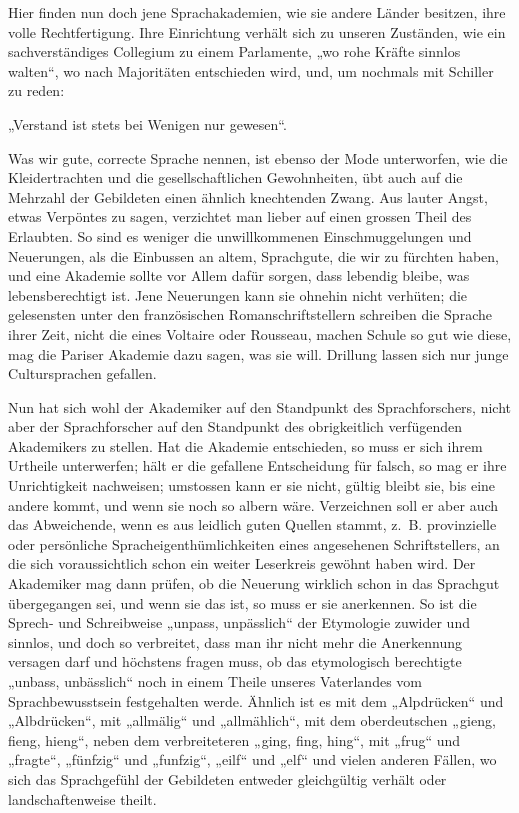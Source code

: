\largerpage[-1]Hier finden nun doch jene Sprachakademien, wie sie andere Länder besitzen, ihre volle Rechtfertigung. Ihre Einrichtung verhält sich zu unseren Zuständen, wie ein sachverständiges Collegium zu einem Parlamente, „wo rohe Kräfte sinnlos walten“, wo nach Majoritäten entschieden wird, und, um nochmals mit Schiller zu reden:

\begin{center}
„Verstand ist stets bei Wenigen nur gewesen“.
\end{center}

Was wir gute, correcte Sprache nennen, ist ebenso der Mode unterworfen, wie die Kleidertrachten und die gesellschaftlichen Gewohnheiten, übt auch auf die Mehrzahl der Gebildeten einen ähnlich knechtenden Zwang. Aus lauter Angst, etwas Verpöntes zu sagen, verzichtet man lieber auf einen grossen Theil des Erlaubten. So sind es weniger die unwillkommenen Einschmuggelungen und Neuerungen, als die Einbussen an altem,  Sprachgute, die wir zu fürchten haben, und eine Akademie sollte vor Allem dafür sorgen, dass lebendig bleibe, was lebensberechtigt ist. Jene Neuerungen kann sie ohnehin nicht verhüten; die gelesensten unter den französischen Romanschriftstellern schreiben die Sprache ihrer Zeit, nicht die eines Voltaire oder Rousseau, machen Schule so gut wie diese, mag die Pariser Akademie dazu sagen, was sie will.  Drillung lassen sich nur junge Cultursprachen gefallen.

Nun hat sich wohl der Akademiker auf den Standpunkt des Sprachforschers, nicht aber der Sprachforscher auf den Standpunkt des obrigkeitlich verfügenden Akademikers zu stellen. Hat die Akademie entschieden, so muss er sich ihrem Urtheile unterwerfen; hält er die gefallene Entscheidung für falsch, so mag er ihre Unrichtigkeit nachweisen; umstossen kann er sie nicht, gültig bleibt sie, bis eine andere kommt, und wenn sie noch so albern wäre. Verzeichnen soll er aber auch das Abweichende, wenn es aus leidlich guten Quellen stammt, z.~B. provinzielle oder persönliche Spracheigenthümlichkeiten eines angesehenen Schriftstellers, an die sich voraussichtlich schon ein weiter Leserkreis gewöhnt haben wird. Der Akademiker mag dann prüfen, ob die Neuerung wirklich schon in das Sprachgut übergegangen sei, und wenn sie das ist, so muss er sie anerkennen. So ist die Sprech- und Schreibweise „unpass, unpässlich“ der Etymologie zuwider und sinnlos, und doch so verbreitet, dass man ihr nicht mehr \label{sp.127} die Anerkennung versagen darf und höchstens \label{fp.135} fragen muss, ob das etymologisch berechtigte „unbass, unbässlich“ noch in einem Theile unseres Vaterlandes vom Sprachbewusstsein festgehalten werde. Ähnlich ist es mit dem „Alpdrücken“ und „Albdrücken“, mit „allmälig“ und „allmählich“, mit dem oberdeutschen „gieng, fieng, hieng“, neben dem verbreiteteren „ging, fing, hing“, mit „frug“ und „fragte“, „fünfzig“ und „funfzig“, „eilf“ und „elf“ und vielen anderen Fällen, wo sich das Sprachgefühl der Gebildeten entweder gleichgültig verhält oder landschaftenweise theilt.

